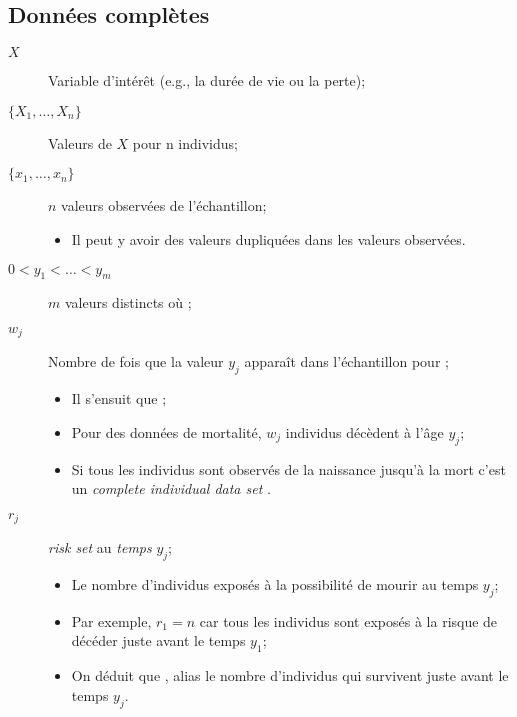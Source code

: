 \documentclass[10pt, french]{article}
\begin{document}
\begin{multicols*}{2}
\subsection{Données complètes}
\begin{distributions}[Notation]
\begin{description}
	\item[$X$]	Variable d'intérêt (e.g., la durée de vie ou la perte);
	\item[$\{X_{1}, \dots, X_{n}\}$]	Valeurs de $X$ pour n individus;
	\item[$\{x_{1}, \dots, x_{n}\}$]	$n$ valeurs observées de l'échantillon;
		\begin{itemize}[leftmargin = *]
		\item	Il peut y avoir des valeurs dupliquées dans les valeurs observées.
		\end{itemize}
	\item[$0	<	y_{1}	<	\hdots	<	y_{m}$]	$m$ valeurs distincts où ;
	\item[$w_{j}$]	Nombre de fois que la valeur $y_{j}$ apparaît dans l'échantillon pour ;
		\begin{itemize}[leftmargin = *]
		\item	Il s'ensuit que ;
		\item	Pour des données de mortalité, $w_{j}$ individus décèdent à l'âge $y_{j}$;
		\item	Si tous les individus sont observés de la naissance jusqu'à la mort c'est un \og \textit{complete individual data set} \fg{}.
		\end{itemize}
	\item[$r_{j}$]	\og \textit{risk set} \fg{} au \textit{temps} $y_{j}$;
		\begin{itemize}[leftmargin = *]
		\item	Le nombre d'individus exposés à la possibilité de mourir au temps $y_{j}$;
		\item	Par exemple, $r_{1}	=	n$ car tous les individus sont exposés à la risque de décéder juste avant le temps $y_{1}$;
		\item	On déduit que , alias le nombre d'individus qui survivent juste avant le temps $y_{j}$.
		\end{itemize}
\end{description}
\end{distributions}


\end{multicols*}
\end{document}
